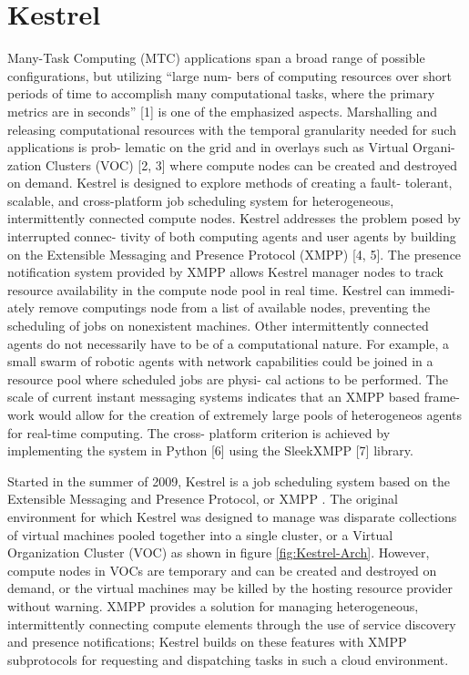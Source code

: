 \chapter{Kestrel}
\label{chap:Kestrel} 

Many-Task Computing (MTC) applications span a broad range of possible
configurations, but utilizing “large num- bers of computing resources over
short periods of time to accomplish many computational tasks, where the primary
metrics are in seconds” [1] is one of the emphasized aspects. Marshalling
and releasing computational resources with the temporal granularity needed for
such applications is prob- lematic on the grid and in overlays such as Virtual
Organi- zation Clusters (VOC) [2, 3] where compute nodes can be created and
destroyed on demand. Kestrel is designed to explore methods of creating a fault-
tolerant, scalable, and cross-platform job scheduling system for heterogeneous,
intermittently connected compute nodes. Kestrel addresses the problem posed
by interrupted connec- tivity of both computing agents and user agents by
building on the Extensible Messaging and Presence Protocol (XMPP) [4, 5]. The
presence notification system provided by XMPP allows Kestrel manager nodes to
track resource availability in the compute node pool in real time. Kestrel can
immedi- ately remove computings node from a list of available nodes, preventing
the scheduling of jobs on nonexistent machines. Other intermittently connected
agents do not necessarily have to be of a computational nature. For example, a
small swarm of robotic agents with network capabilities could be joined in a
resource pool where scheduled jobs are physi- cal actions to be performed. The
scale of current instant messaging systems indicates that an XMPP based frame-
work would allow for the creation of extremely large pools of heterogeneos
agents for real-time computing. The cross- platform criterion is achieved by
implementing the system in Python [6] using the SleekXMPP [7] library.


Started in the summer of 2009, Kestrel is a job scheduling system
based on the Extensible Messaging and Presence Protocol, or XMPP
\cite{Saint-Andre2004}\cite{Saint-Andre2004a}. The original environment for
which Kestrel was designed to manage was disparate collections of virtual
machines pooled together into a single cluster, or a Virtual Organization
Cluster (VOC) \cite{Murphy2009} as shown in figure \ref{fig:Kestrel-Arch}.
However, compute nodes in VOCs are temporary and can be created and destroyed
on demand, or the virtual machines may be killed by the hosting resource
provider without warning. XMPP provides a solution for managing heterogeneous,
intermittently connecting compute elements through the use of service discovery
and presence notifications; Kestrel builds on these features with XMPP
subprotocols for requesting and dispatching tasks in such a cloud environment.


